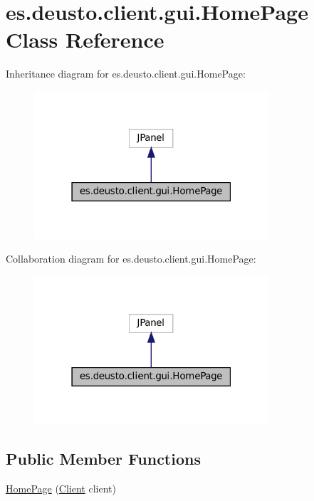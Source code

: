 \hypertarget{classes_1_1deusto_1_1client_1_1gui_1_1_home_page}{}\section{es.\+deusto.\+client.\+gui.\+Home\+Page Class Reference}
\label{classes_1_1deusto_1_1client_1_1gui_1_1_home_page}


Inheritance diagram for es.\+deusto.\+client.\+gui.\+Home\+Page\+:
\nopagebreak
\begin{figure}[H]
\begin{center}
\leavevmode
\includegraphics[width=247pt]{classes_1_1deusto_1_1client_1_1gui_1_1_home_page__inherit__graph}
\end{center}
\end{figure}


Collaboration diagram for es.\+deusto.\+client.\+gui.\+Home\+Page\+:
\nopagebreak
\begin{figure}[H]
\begin{center}
\leavevmode
\includegraphics[width=247pt]{classes_1_1deusto_1_1client_1_1gui_1_1_home_page__coll__graph}
\end{center}
\end{figure}
\subsection*{Public Member Functions}
\begin{DoxyCompactItemize}
\item 
\mbox{\hyperlink{classes_1_1deusto_1_1client_1_1gui_1_1_home_page_ada47f27769156f1d11578e12e651beed}{Home\+Page}} (\mbox{\hyperlink{classes_1_1deusto_1_1client_1_1_client}{Client}} client)
\end{DoxyCompactItemize}


